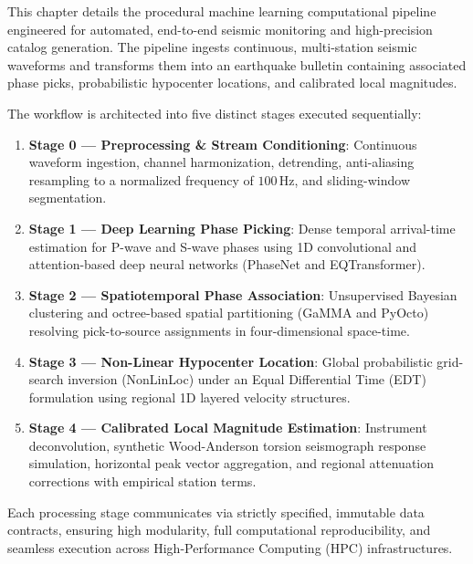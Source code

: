
\label{chap:pipeline}

This chapter details the procedural machine learning computational pipeline engineered for automated, end-to-end seismic monitoring and high-precision catalog generation. The pipeline ingests continuous, multi-station seismic waveforms and transforms them into an earthquake bulletin containing associated phase picks, probabilistic hypocenter locations, and calibrated local magnitudes.

The workflow is architected into five distinct stages executed sequentially:
\begin{enumerate}
  \item \textbf{Stage 0 --- Preprocessing \& Stream Conditioning}: Continuous waveform ingestion, channel harmonization, detrending, anti-aliasing resampling to a normalized frequency of $100\,\mathrm{Hz}$, and sliding-window segmentation.
  \item \textbf{Stage 1 --- Deep Learning Phase Picking}: Dense temporal arrival-time estimation for P-wave and S-wave phases using 1D convolutional and attention-based deep neural networks (PhaseNet and EQTransformer).
  \item \textbf{Stage 2 --- Spatiotemporal Phase Association}: Unsupervised Bayesian clustering and octree-based spatial partitioning (GaMMA and PyOcto) resolving pick-to-source assignments in four-dimensional space-time.
  \item \textbf{Stage 3 --- Non-Linear Hypocenter Location}: Global probabilistic grid-search inversion (NonLinLoc) under an Equal Differential Time (EDT) formulation using regional 1D layered velocity structures.
  \item \textbf{Stage 4 --- Calibrated Local Magnitude Estimation}: Instrument deconvolution, synthetic Wood-Anderson torsion seismograph response simulation, horizontal peak vector aggregation, and regional attenuation corrections with empirical station terms.
\end{enumerate}

Each processing stage communicates via strictly specified, immutable data contracts, ensuring high modularity, full computational reproducibility, and seamless execution across High-Performance Computing (HPC) infrastructures.

